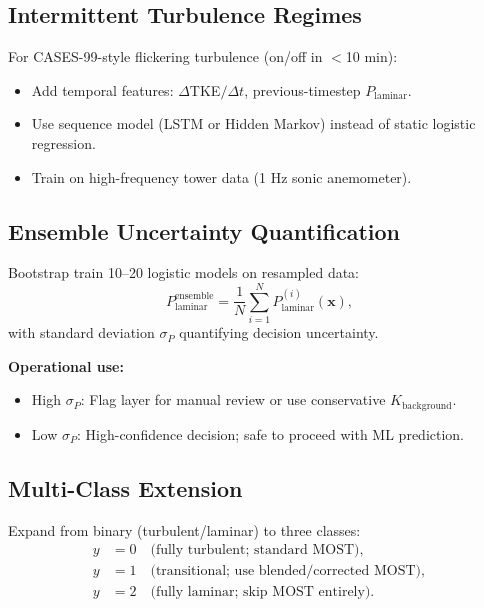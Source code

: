 \documentclass[11pt]{article}
\begin{document}
\subsection{Intermittent Turbulence Regimes}

For CASES-99-style flickering turbulence (on/off in $<$10 min):
\begin{itemize}[leftmargin=*]
\item Add temporal features: $\Delta$TKE$/\Delta t$, previous-timestep $P_{\text{laminar}}$.
\item Use sequence model (LSTM or Hidden Markov) instead of static logistic regression.
\item Train on high-frequency tower data (1 Hz sonic anemometer).
\end{itemize}

\subsection{Ensemble Uncertainty Quantification}

Bootstrap train 10--20 logistic models on resampled data:
\begin{equation}
P_{\text{laminar}}^{\text{ensemble}} = \frac{1}{N}\sum_{i=1}^{N} P_{\text{laminar}}^{(i)}(\mathbf{x}),
\label{eq:ensemble_probability}
\end{equation}
with standard deviation $\sigma_P$ quantifying decision uncertainty.

\textbf{Operational use:}
\begin{itemize}[leftmargin=*]
\item High $\sigma_P$: Flag layer for manual review or use conservative $K_{\text{background}}$.
\item Low $\sigma_P$: High-confidence decision; safe to proceed with ML prediction.
\end{itemize}

\subsection{Multi-Class Extension}

Expand from binary (turbulent/laminar) to three classes:
\begin{align}
y &= 0 \quad \text{(fully turbulent; standard MOST)}, \label{eq:class_0} \\
y &= 1 \quad \text{(transitional; use blended/corrected MOST)}, \label{eq:class_1} \\
y &= 2 \quad \text{(fully laminar; skip MOST entirely)}. \label{eq:class_2}
\end{align}
\end{document}
